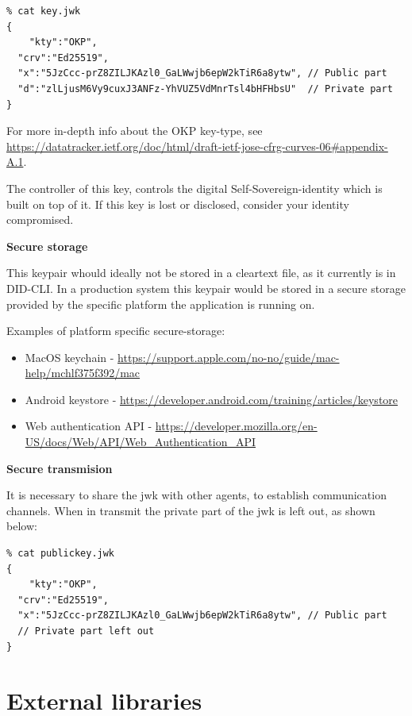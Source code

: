 \begin{lstlisting}
% cat key.jwk 
{
    "kty":"OKP",
  "crv":"Ed25519",
  "x":"5JzCcc-prZ8ZILJKAzl0_GaLWwjb6epW2kTiR6a8ytw", // Public part
  "d":"zlLjusM6Vy9cuxJ3ANFz-YhVUZ5VdMnrTsl4bHFHbsU"  // Private part
}
\end{lstlisting}

For more in-depth info about the OKP key-type, see
\url{https://datatracker.ietf.org/doc/html/draft-ietf-jose-cfrg-curves-06\#appendix-A.1}.

The controller of this key, controls the digital Self-Sovereign-identity
which is built on top of it. If this key is lost or disclosed, consider
your identity compromised.

\textbf{Secure storage}

This keypair whould ideally not be stored in a cleartext file, as it
currently is in DID-CLI. In a production system this keypair would be
stored in a secure storage provided by the specific platform the
application is running on.

Examples of platform specific secure-storage:

\begin{itemize}
\tightlist
\item
  MacOS keychain -
  \url{https://support.apple.com/no-no/guide/mac-help/mchlf375f392/mac}
\item
  Android keystore -
  \url{https://developer.android.com/training/articles/keystore}
\item
  Web authentication API -
  \url{https://developer.mozilla.org/en-US/docs/Web/API/Web_Authentication_API}
\end{itemize}

\textbf{Secure transmision}

It is necessary to share the jwk with other agents, to establish
communication channels. When in transmit the private part of the jwk is
left out, as shown below:

\begin{lstlisting}
% cat publickey.jwk 
{
    "kty":"OKP",
  "crv":"Ed25519",
  "x":"5JzCcc-prZ8ZILJKAzl0_GaLWwjb6epW2kTiR6a8ytw", // Public part
  // Private part left out
} 
\end{lstlisting}

\hypertarget{external-libraries}{%
\section{External libraries}\label{external-libraries}}

